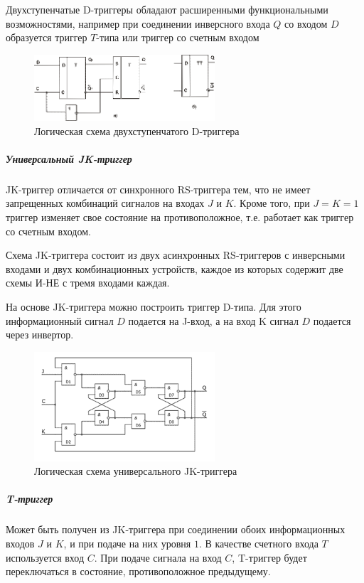 \documentclass{article}
\begin{document}
\begin{flushleft}
Двухступенчатые D-триггеры обладают расширенными функциональными возможностями, например при соединении инверсного входа $Q$ со входом $D$ образуется триггер $T$-типа или триггер со счетным входом

\begin{figure}
\caption{Логическая схема двухступенчатого D-триггера}
\includegraphics[width=0.6\textwidth]{assets/two_stage_d_trigger.png}
\end{figure}

\pagebreak
\subparagraph{Универсальный JK-триггер}

JK-триггер отличается от синхронного RS-триггера тем, что не имеет запрещенных комбинаций сигналов на входах $J$ и $K$. Кроме того, при $J = K = 1$ триггер изменяет свое состояние на противоположное, т.е. работает как триггер со счетным входом.

Схема JK-триггера состоит из двух асинхронных RS-триггеров с инверсными входами и двух комбинационных устройств, каждое из которых содержит две схемы И-НЕ с тремя входами каждая.

На основе JK-триггера можно построить триггер D-типа. Для этого информационный сигнал $D$ подается на J-вход, а на вход K сигнал $D$ подается через инвертор.

\begin{figure}
\caption{Логическая схема универсального JK-триггера}
\includegraphics[width=0.6\textwidth]{assets/jk_trigger.png}
\end{figure}

\subparagraph{T-триггер}

Может быть получен из JK-триггера при соединении обоих информационных входов $J$ и $K$, и при подаче на них уровня $1$. В качестве счетного входа $T$ используется вход $C$. При подаче сигнала на вход $C$, T-триггер будет переключаться в состояние, противоположное предыдущему.


\end{flushleft}
\end{document}
